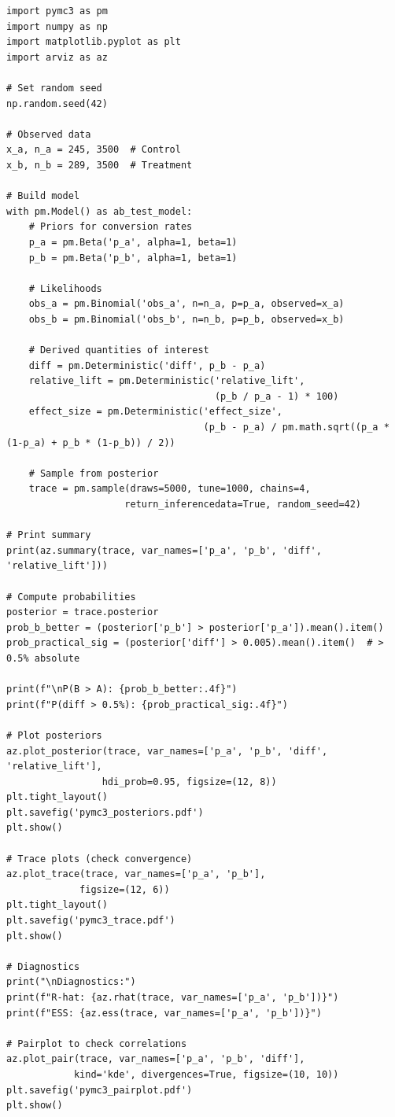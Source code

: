 \begin{lstlisting}
import pymc3 as pm
import numpy as np
import matplotlib.pyplot as plt
import arviz as az

# Set random seed
np.random.seed(42)

# Observed data
x_a, n_a = 245, 3500  # Control
x_b, n_b = 289, 3500  # Treatment

# Build model
with pm.Model() as ab_test_model:
    # Priors for conversion rates
    p_a = pm.Beta('p_a', alpha=1, beta=1)
    p_b = pm.Beta('p_b', alpha=1, beta=1)

    # Likelihoods
    obs_a = pm.Binomial('obs_a', n=n_a, p=p_a, observed=x_a)
    obs_b = pm.Binomial('obs_b', n=n_b, p=p_b, observed=x_b)

    # Derived quantities of interest
    diff = pm.Deterministic('diff', p_b - p_a)
    relative_lift = pm.Deterministic('relative_lift',
                                     (p_b / p_a - 1) * 100)
    effect_size = pm.Deterministic('effect_size',
                                   (p_b - p_a) / pm.math.sqrt((p_a * (1-p_a) + p_b * (1-p_b)) / 2))

    # Sample from posterior
    trace = pm.sample(draws=5000, tune=1000, chains=4,
                     return_inferencedata=True, random_seed=42)

# Print summary
print(az.summary(trace, var_names=['p_a', 'p_b', 'diff', 'relative_lift']))

# Compute probabilities
posterior = trace.posterior
prob_b_better = (posterior['p_b'] > posterior['p_a']).mean().item()
prob_practical_sig = (posterior['diff'] > 0.005).mean().item()  # > 0.5% absolute

print(f"\nP(B > A): {prob_b_better:.4f}")
print(f"P(diff > 0.5%): {prob_practical_sig:.4f}")

# Plot posteriors
az.plot_posterior(trace, var_names=['p_a', 'p_b', 'diff', 'relative_lift'],
                 hdi_prob=0.95, figsize=(12, 8))
plt.tight_layout()
plt.savefig('pymc3_posteriors.pdf')
plt.show()

# Trace plots (check convergence)
az.plot_trace(trace, var_names=['p_a', 'p_b'],
             figsize=(12, 6))
plt.tight_layout()
plt.savefig('pymc3_trace.pdf')
plt.show()

# Diagnostics
print("\nDiagnostics:")
print(f"R-hat: {az.rhat(trace, var_names=['p_a', 'p_b'])}")
print(f"ESS: {az.ess(trace, var_names=['p_a', 'p_b'])}")

# Pairplot to check correlations
az.plot_pair(trace, var_names=['p_a', 'p_b', 'diff'],
            kind='kde', divergences=True, figsize=(10, 10))
plt.savefig('pymc3_pairplot.pdf')
plt.show()
\end{lstlisting}

